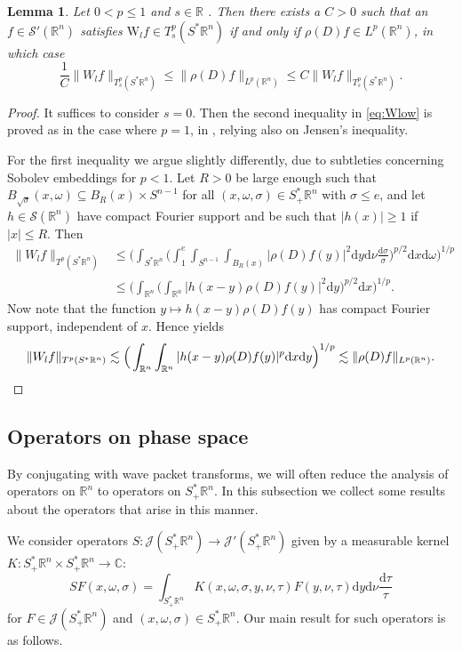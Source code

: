 \documentclass{amsart}
\newcommand {\C}{{\mathbb C}}
\newcommand {\ud}{\mathrm{d}}
\newcommand {\J}{\mathcal{J}}
\newcommand {\R}{\mathbb R}
\newcommand {\Rn}{\mathbb{R}^{n}}
\newcommand {\Sp}{S^{*}\Rn}
\newcommand {\Spp}{S^{*}_{+}\Rn}
\newcommand {\Sw}{\mathcal{S}}
\newcommand {\w}{\omega}
\newcommand {\W}{\mathrm{W}}
\newcommand {\wt}{\widetilde}
\newtheorem{lemma}[theorem]{Lemma}
\theoremstyle{definition}
\numberwithin{equation}{section}
\begin{document}
\begin{lemma}\label{lem:Wlow}
Let $0<p\leq 1$ and $s\in\R$%
. Then there exists a $C>0$ such that an $f\in\Sw'(\Rn)$ satisfies $\W_{l}f\in T^{p}_{s}(\Sp)$ if and only if $\rho(D)f\in L^{p}(\Rn)$, in which case
\begin{equation}\label{eq:Wlow}
\frac{1}{C}\|W_{l}f\|_{T^{p}_{s}(\Sp)}\leq \|\rho(D)f\|_{L^{p}(\Rn)}\leq C\|W_{l}f\|_{T^{p}_{s}(\Sp)}.
\end{equation}
\end{lemma}
\begin{proof}
It suffices to consider $s=0$. Then the second inequality in \eqref{eq:Wlow} is proved as in the case where $p=1$, in \cite[Lemma A.1]{HaPoRo20}, relying also on Jensen's inequality. 

For the first inequality we argue slightly differently, due to subtleties concerning Sobolev embeddings for $p<1$. Let $R>0$ be large enough such that $B_{\sqrt{\sigma}}(x,\w)\subseteq B_{R}(x)\times S^{n-1}$ for all $(x,\w,\sigma)\in\Spp$ with $\sigma\leq e$, and let $h\in\Sw(\Rn)$ have compact Fourier support and be such that $|h(x)|\geq 1$ if $|x|\leq R$. Then
\begin{align*}
\|W_{l}f\|_{T^{p}(\Sp)}&\leq \Big(\int_{\Sp}\Big(\int_{1}^{e}\int_{S^{n-1}}\int_{B_{R}(x)}|\rho(D)f(y)|^{2}\ud y\ud\nu\frac{\ud\sigma}{\sigma}\Big)^{p/2}\ud x\ud\w\Big)^{1/p}\\
&\leq \Big(\int_{\Rn}\Big(\int_{\Rn}|h(x-y)\rho(D)f(y)|^{2}\ud y\Big)^{p/2}\ud x\Big)^{1/p}.
\end{align*}
Now note that the function $y\mapsto h(x-y)\rho(D)f(y)$ has compact Fourier support, independent of $x$. Hence \cite[Theorem 1.4.1]{Triebel10} yields
\[
\|W_{l}f\|_{T^{p}(\Sp)}\lesssim \Big(\int_{\Rn}\int_{\Rn}|h(x-y)\rho(D)f(y)|^{p}\ud x\ud y\Big)^{1/p}\lesssim \|\rho(D)f\|_{L^{p}(\Rn)}.\qedhere
\]
\end{proof}

\subsection{Operators on phase space}\label{subsec:operatorphase}

By conjugating with wave packet transforms, we will often reduce the analysis of operators on $\Rn$ to operators on $\Spp$. In this subsection we collect some results about the operators that arise in this manner. 

We consider operators $S:\J(\Spp)\to\J'(\Spp)$ given by a measurable kernel $K:\Spp\times\Spp\to \C$:
\begin{equation}\label{eq:kernelphase}
SF(x,\w,\sigma)=\int_{\Spp}K(x,\w,\sigma,y,\nu,\tau)F(y,\nu,\tau)\ud y\ud\nu\frac{\ud\tau}{\tau}
\end{equation}
for $F\in \J(\Spp)$ and $(x,\w,\sigma)\in\Spp$. Our main result for such operators is as follows.
\end{document}
